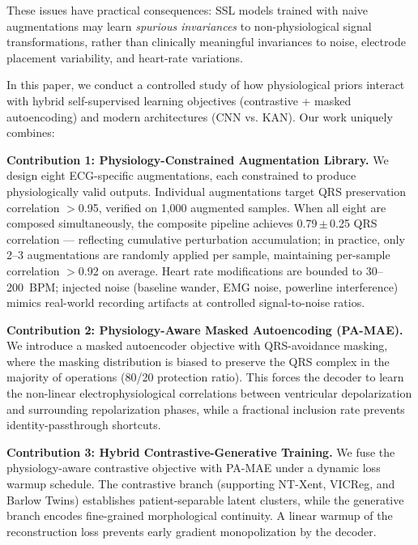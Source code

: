 \documentclass[journal,10pt]{IEEEtran}
\begin{document}
These issues have practical consequences: SSL models trained with naive augmentations may learn \emph{spurious invariances} to non-physiological signal transformations, rather than clinically meaningful invariances to noise, electrode placement variability, and heart-rate variations.

In this paper, we conduct a controlled study of how physiological priors interact with hybrid self-supervised learning objectives (contrastive + masked autoencoding) and modern architectures (CNN vs. KAN). Our work uniquely combines:

\vspace{0.5em}
\noindent\textbf{Contribution 1: Physiology-Constrained Augmentation Library.} We design eight ECG-specific augmentations, each constrained to produce physiologically valid outputs. Individual augmentations target QRS preservation correlation $>$0.95, verified on 1,000 augmented samples. When all eight are composed simultaneously, the composite pipeline achieves 0.79\,$\pm$\,0.25 QRS correlation — reflecting cumulative perturbation accumulation; in practice, only 2--3 augmentations are randomly applied per sample, maintaining per-sample correlation $>$0.92 on average. Heart rate modifications are bounded to 30--200~BPM; injected noise (baseline wander, EMG noise, powerline interference) mimics real-world recording artifacts at controlled signal-to-noise ratios.

\vspace{0.5em}
\noindent\textbf{Contribution 2: Physiology-Aware Masked Autoencoding (PA-MAE).} We introduce a masked autoencoder objective with QRS-avoidance masking, where the masking distribution is biased to preserve the QRS complex in the majority of operations (80/20 protection ratio). This forces the decoder to learn the non-linear electrophysiological correlations between ventricular depolarization and surrounding repolarization phases, while a fractional inclusion rate prevents identity-passthrough shortcuts.

\vspace{0.5em}
\noindent\textbf{Contribution 3: Hybrid Contrastive-Generative Training.} We fuse the physiology-aware contrastive objective with PA-MAE under a dynamic loss warmup schedule. The contrastive branch (supporting NT-Xent, VICReg, and Barlow Twins) establishes patient-separable latent clusters, while the generative branch encodes fine-grained morphological continuity. A linear warmup of the reconstruction loss prevents early gradient monopolization by the decoder.
\end{document}
